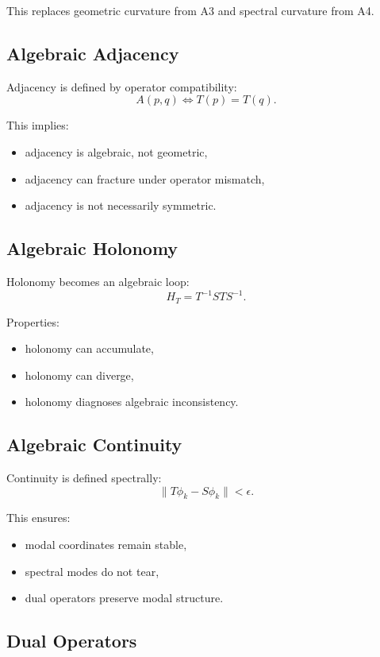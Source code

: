 This replaces geometric curvature from A3 and spectral curvature from A4.

\subsection{Algebraic Adjacency}

Adjacency is defined by operator compatibility:
\[
A(p,q) \iff T(p) = T(q).
\]

This implies:
\begin{itemize}
  \item adjacency is algebraic, not geometric,
  \item adjacency can fracture under operator mismatch,
  \item adjacency is not necessarily symmetric.
\end{itemize}

\subsection{Algebraic Holonomy}

Holonomy becomes an algebraic loop:
\[
H_T = T^{-1} S T S^{-1}.
\]

Properties:
\begin{itemize}
  \item holonomy can accumulate,
  \item holonomy can diverge,
  \item holonomy diagnoses algebraic inconsistency.
\end{itemize}

\subsection{Algebraic Continuity}

Continuity is defined spectrally:
\[
\| T\phi_k - S\phi_k \| < \epsilon.
\]

This ensures:
\begin{itemize}
  \item modal coordinates remain stable,
  \item spectral modes do not tear,
  \item dual operators preserve modal structure.
\end{itemize}

\subsection{Dual Operators}

